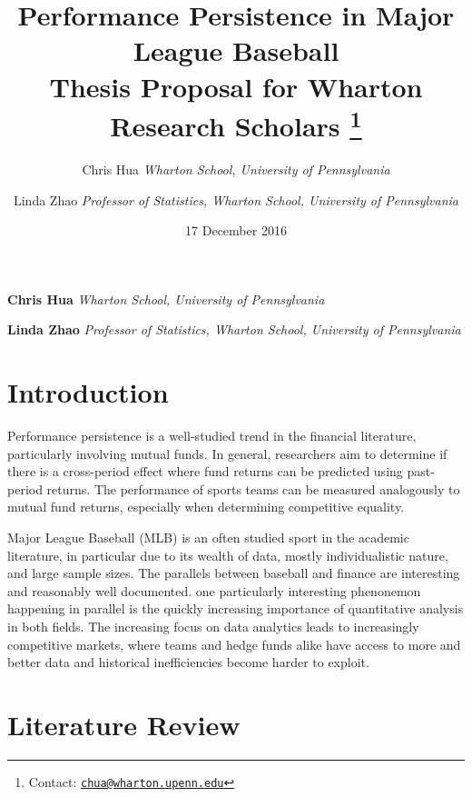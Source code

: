 \documentclass[11pt,]{scrartcl}
\title{Performance Persistence in Major League Baseball\\ Thesis Proposal for Wharton Research Scholars  \thanks{Contact:
\href{mailto:chua@wharton.upenn.edu}{\nolinkurl{chua@wharton.upenn.edu}}}  }
\date{17 December 2016}
\author{\Large Chris Hua\vspace{0.05in} \newline\normalsize\emph{Wharton School, University of Pennsylvania}   \and \Large Linda Zhao\vspace{0.05in} \newline\normalsize\emph{Professor of Statistics, Wharton School, University of Pennsylvania}  }
\newcommand*{\authorfont}{\fontfamily{pbk}\selectfont}
\begin{document}
  

{%

\setlength{\parindent}{0pt}
\thispagestyle{empty}
{
\fontsize{18}{20}\selectfont\raggedright 
\maketitle  %
}
{
\vskip 13.5pt\relax \normalsize\fontsize{11}{12} 
 \textbf{\authorfont Chris Hua} \hfill \emph{\small Wharton School, University of Pennsylvania}   \par  \textbf{\authorfont Linda Zhao} \hfill \emph{\small Professor of Statistics, Wharton School, University of Pennsylvania}   
}

}



\vskip 6.5pt

\noindent \onehalfspacing \newpage

\section{Introduction}\label{introduction}

Performance persistence is a well-studied trend in the financial
literature, particularly involving mutual funds. In general, researchers
aim to determine if there is a cross-period effect where fund returns
can be predicted using past-period returns. The performance of sports
teams can be measured analogously to mutual fund returns, especially
when determining competitive equality.

Major League Baseball (MLB) is an often studied sport in the academic
literature, in particular due to its wealth of data, mostly
individualistic nature, and large sample sizes. The parallels between
baseball and finance are interesting and reasonably well documented. one
particularly interesting phenonemon happening in parallel is the quickly
increasing importance of quantitative analysis in both fields. The
increasing focus on data analytics leads to increasingly competitive
markets, where teams and hedge funds alike have access to more and
better data and historical inefficiencies become harder to exploit.

\section{Literature Review}\label{literature-review}
\end{document}
